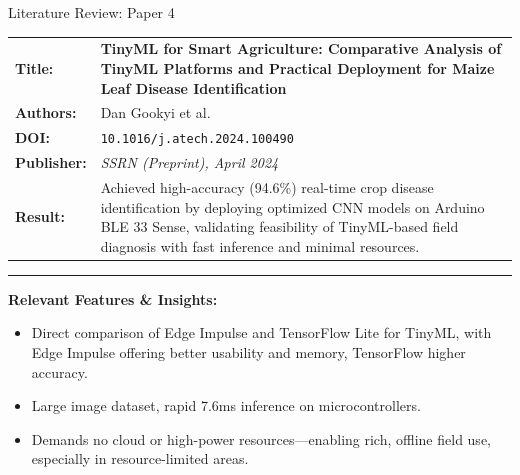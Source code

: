 \documentclass{beamer}
\begin{document}
\begin{frame} {Literature Review: Paper 4}

    \begin{tabularx} {\textwidth} {
            >{\bfseries}m{2.0cm}X
        }

        Title: & \textbf{TinyML for Smart Agriculture: Comparative Analysis of TinyML Platforms and Practical Deployment for Maize Leaf Disease Identification}
        \\

        Authors: & Dan Gookyi et al.
        \\

        DOI: & \texttt{10.1016/j.atech.2024.100490}

        \\

        Publisher: & \textit{SSRN (Preprint), April 2024} \vfill
        \\

        Result: &
        Achieved high-accuracy (94.6\%) real-time crop disease identification by deploying optimized
        CNN models on Arduino BLE 33 Sense, validating feasibility of TinyML-based field diagnosis
        with fast inference and minimal resources.

        \\

    \end{tabularx}

    {\color{leafColorSecondary} \rule{\textwidth}{0.75pt}}

    \textbf{Relevant Features \& Insights:}

    \begin{itemize}

        \item Direct comparison of Edge Impulse and TensorFlow Lite for TinyML, with Edge Impulse offering better usability and memory, TensorFlow higher accuracy.

        \item Large image dataset, rapid 7.6ms inference on microcontrollers.

        \item Demands no cloud or high-power resources—enabling rich, offline field use, especially in resource-limited areas.

    \end{itemize}

\end{frame}
\end{document}
